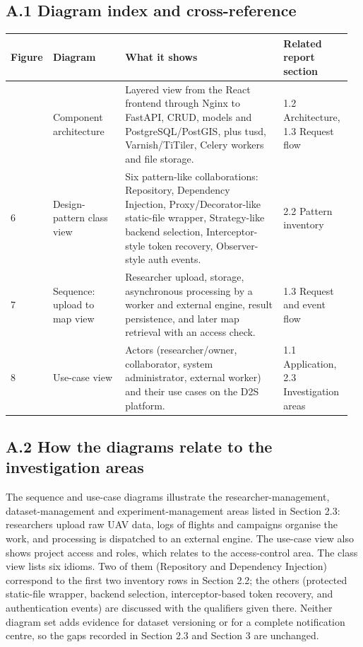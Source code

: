 \documentclass[11pt,a4paper]{article}
\begin{document}
\subsection*{A.1 Diagram index and cross-reference}
\small
\begin{longtable}{@{}L{0.09\linewidth}L{0.21\linewidth}L{0.46\linewidth}L{0.2\linewidth}@{}}
\toprule
\textbf{Figure} & \textbf{Diagram} & \textbf{What it shows} & \textbf{Related report section}\\
\midrule\endfirsthead
\bottomrule{} & Component architecture & Layered view from the React frontend through Nginx to FastAPI, CRUD, models and PostgreSQL/PostGIS, plus tusd, Varnish/TiTiler, Celery workers and file storage. & 1.2 Architecture, 1.3 Request flow\\
6 & Design-pattern class view & Six pattern-like collaborations: Repository, Dependency Injection, Proxy/Decorator-like static-file wrapper, Strategy-like backend selection, Interceptor-style token recovery, Observer-style auth events. & 2.2 Pattern inventory\\
7 & Sequence: upload to map view & Researcher upload, storage, asynchronous processing by a worker and external engine, result persistence, and later map retrieval with an access check. & 1.3 Request and event flow\\
8 & Use-case view & Actors (researcher/owner, collaborator, system administrator, external worker) and their use cases on the D2S platform. & 1.1 Application, 2.3 Investigation areas\\
\end{longtable}
\normalsize

\subsection*{A.2 How the diagrams relate to the investigation areas}
The sequence and use-case diagrams illustrate the researcher-management, dataset-management and experiment-management areas listed in Section 2.3: researchers upload raw UAV data, logs of flights and campaigns organise the work, and processing is dispatched to an external engine. The use-case view also shows project access and roles, which relates to the access-control area. The class view lists six idioms. Two of them (Repository and Dependency Injection) correspond to the first two inventory rows in Section 2.2; the others (protected static-file wrapper, backend selection, interceptor-based token recovery, and authentication events) are discussed with the qualifiers given there. Neither diagram set adds evidence for dataset versioning or for a complete notification centre, so the gaps recorded in Section 2.3 and Section 3 are unchanged.
\end{document}
